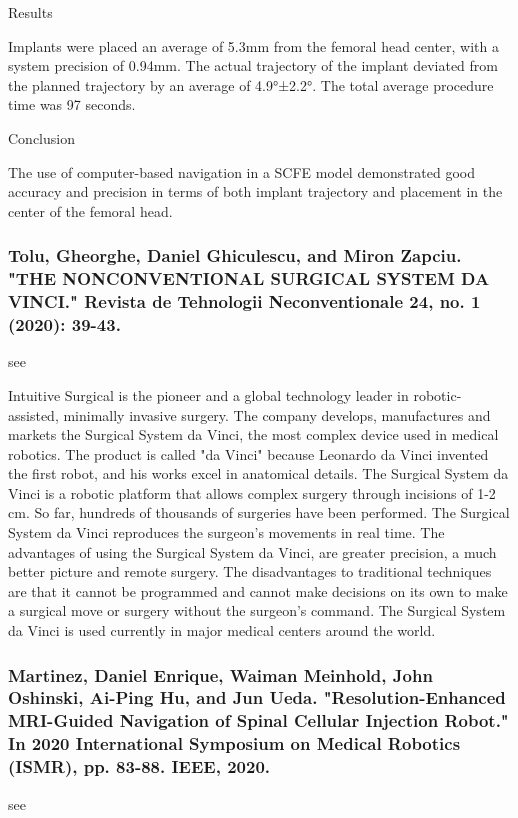 \documentclass[conference]{IEEEtran}
\begin{document}
Results

Implants were placed an average of 5.3mm from the femoral head center, with a system precision of 0.94mm. The actual trajectory of the implant deviated from the planned trajectory by an average of 4.9°±2.2°. The total average procedure time was 97 seconds.

Conclusion

The use of computer-based navigation in a SCFE model demonstrated good accuracy and precision in terms of both implant trajectory and placement in the center of the femoral head.

\medskip
\subsubsection{Tolu, Gheorghe, Daniel Ghiculescu, and Miron Zapciu. "THE NONCONVENTIONAL SURGICAL SYSTEM DA VINCI." Revista de Tehnologii Neconventionale 24, no. 1 (2020): 39-43.}
see \cite{tolu2020nonconventional}

Intuitive Surgical is the pioneer and a global technology leader in robotic-assisted, minimally invasive surgery. The company develops, manufactures and markets the Surgical System da Vinci, the most complex device used in medical robotics. The product is called "da Vinci" because Leonardo da Vinci invented the first robot, and his works excel in anatomical details. The Surgical System da Vinci is a robotic platform that allows complex surgery through incisions of 1-2 cm. So far, hundreds of thousands of surgeries have been performed. The Surgical System da Vinci reproduces the surgeon's movements in real time. The advantages of using the Surgical System da Vinci, are greater precision, a much better picture and remote surgery. The disadvantages to traditional techniques are that it cannot be programmed and cannot make decisions on its own to make a surgical move or surgery without the surgeon's command. The Surgical System da Vinci is used currently in major medical centers around the world.

\medskip
\subsubsection{Martinez, Daniel Enrique, Waiman Meinhold, John Oshinski, Ai-Ping Hu, and Jun Ueda. "Resolution-Enhanced MRI-Guided Navigation of Spinal Cellular Injection Robot." In 2020 International Symposium on Medical Robotics (ISMR), pp. 83-88. IEEE, 2020.}
see \cite{martinez2020resolution}
\end{document}
